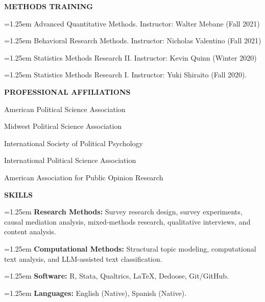 \documentclass[11pt]{article}
\newlength{\leftcol}
\newlength{\rightcol}
\newcommand{\cvsection}[2]{%
\vspace{1.2em}
\noindent
\begin{minipage}[t]{\leftcol}
\raggedright \bfseries #1
\end{minipage}
\hspace{0.35in}
\begin{minipage}[t]{\rightcol}
#2
\end{minipage}
\par
}
\newcommand{\entry}[1]{%
\hangindent=1.25em
\hangafter=1
#1\par\vspace{0.35em}
}
\begin{document}
\cvsection{METHODS TRAINING}{

\entry{Advanced Quantitative Methods. Instructor: Walter Mebane (Fall 2021)}

\entry{Behavioral Research Methods. Instructor: Nicholas Valentino (Fall 2021)}

\entry{Statistics Methods Research II. Instructor: Kevin Quinn (Winter 2020)}

\entry{Statistics Methods Research I. Instructor: Yuki Shiraito (Fall 2020).}
}
\vspace{0.45em}

\cvsection{PROFESSIONAL AFFILIATIONS}{
American Political Science Association\par
Midwest Political Science Association\par
International Society of Political Psychology\par 
International Political Science Association\par
American Association for Public Opinion Research
}
\vspace{0.45em}

\cvsection{SKILLS}{
\entry{\textbf{Research Methods:} Survey research design, survey experiments, causal mediation analysis, mixed-methods research, qualitative interviews, and content analysis.}

\entry{\textbf{Computational Methods:} Structural topic modeling, computational text analysis, and LLM-assisted text classification.}

\entry{\textbf{Software:} R, Stata, Qualtrics, \LaTeX, Dedoose, Git/GitHub.}

\entry{\textbf{Languages:} English (Native), Spanish (Native).}
}
\end{document}
